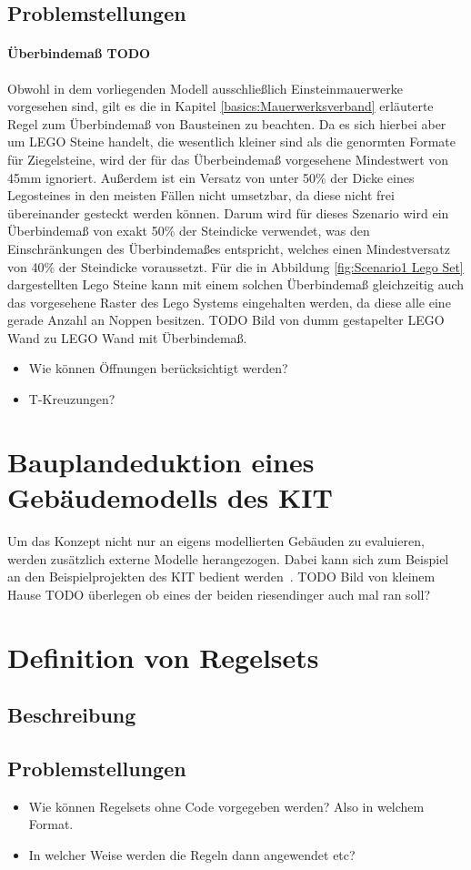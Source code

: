 \subsection*{Problemstellungen}
\paragraph{Überbindemaß TODO}
Obwohl in dem vorliegenden Modell ausschließlich Einsteinmauerwerke vorgesehen sind, gilt es die in Kapitel \ref{basics:Mauerwerksverband} erläuterte Regel zum Überbindemaß von Bausteinen zu beachten.
Da es sich hierbei aber um LEGO Steine handelt, die wesentlich kleiner sind als die genormten Formate für Ziegelsteine, wird der für das Überbeindemaß vorgesehene Mindestwert von 45mm ignoriert.
Außerdem ist ein Versatz von unter 50\% der Dicke eines Legosteines in den meisten Fällen nicht umsetzbar, da diese nicht frei übereinander gesteckt werden können.
Darum wird für dieses Szenario wird ein Überbindemaß von exakt 50\% der Steindicke verwendet, was den Einschränkungen des Überbindemaßes entspricht, welches einen Mindestversatz von 40\% der Steindicke voraussetzt.
Für die in Abbildung \ref{fig:Scenario1 Lego Set} dargestellten Lego Steine kann mit einem solchen Überbindemaß gleichzeitig auch das vorgesehene Raster des Lego Systems eingehalten werden, da diese alle eine gerade Anzahl an Noppen besitzen.
TODO Bild von dumm gestapelter LEGO Wand zu LEGO Wand mit Überbindemaß.
\begin{itemize}
  \item Wie können Öffnungen berücksichtigt werden?
  \item T-Kreuzungen?
\end{itemize}

\section{Bauplandeduktion eines Gebäudemodells des KIT}\label{scenarios:scenario3}
Um das Konzept nicht nur an eigens modellierten Gebäuden zu evaluieren, werden zusätzlich externe Modelle herangezogen.
Dabei kann sich zum Beispiel an den Beispielprojekten des KIT bedient werden~\cite{KITSAMPLEHOUSE:online}.
TODO Bild von kleinem Hause
TODO überlegen ob eines der beiden riesendinger auch mal ran soll?

\section{Definition von Regelsets}\label{scenarios:scenario4}
\subsection*{Beschreibung}
\subsection*{Problemstellungen}
\begin{itemize}
  \item Wie können Regelsets ohne Code vorgegeben werden? Also in welchem Format.
  \item In welcher Weise werden die Regeln dann angewendet etc?
\end{itemize}